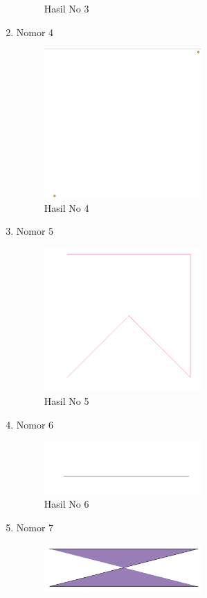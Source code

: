 \begin{enumerate}
\begin{figure}[H]
		\centering
		\caption{Hasil No 3}
	\end{figure}
	\item Nomor 4
	
	\begin{figure}[H]
		\includegraphics[width=6cm]{figures/Tugas2/1174079/no4.PNG}
		\centering
		\caption{Hasil No 4}
	\end{figure}
	\item Nomor 5
	
	\begin{figure}[H]
		\includegraphics[width=6cm]{figures/Tugas2/1174079/no5.PNG}
		\centering
		\caption{Hasil No 5}
	\end{figure}
	\item Nomor 6
	
	\begin{figure}[H]
		\includegraphics[width=6cm]{figures/Tugas2/1174079/no6.PNG}
		\centering
		\caption{Hasil No 6}
	\end{figure}
	\item Nomor 7
	
	\begin{figure}[H]
		\includegraphics[width=6cm]{figures/Tugas2/1174079/no7.PNG}

\end{figure}
\end{enumerate}
